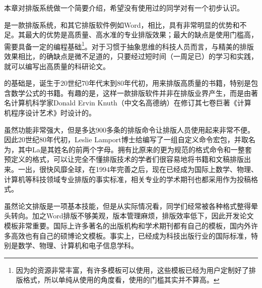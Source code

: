 

本章对排版系统做一个简要介绍，希望没有使用过的同学对有一个初步认识。


是一款排版系统，和其它排版软件例如Word，相比，具有非常明显的优势和不足。其最大的优势是高质量、高水准的专业排版效果；最大的缺点是使用门槛高，需要具备一定的编程基础\footnote{因为的资源非常丰富，有许多模板可以使用，这些模板已经为用户定制好了排版格式，所以单纯从使用的角度看，使用的门槛其实并不算高。}。对于习惯于抽象思维的科技人员而言，与精美的排版效果相比，的确缺点是微不足道的，只要经过短时间（一周足已）的学习和实践，就可以编写出高质量的科研论文。

的基础是，诞生于20世纪70年代末到80年代初，用来排版高质量的书籍，特别是包含数学公式的书籍。有趣的是，这样一款排版软件并非在排版业界产生，而是由著名计算机科学家Donald Ervin Knuth（中文名高德纳）在修订其七卷巨著《计算机程序设计艺术》时设计的。

虽然功能非常强大，但是多达900多条的排版命令让排版人员使用起来非常不便。因此20世纪80年代初，Leslie Lamport博士给编写了一组自定义命令宏包，并取名为，其中La是其姓名的前两个字母。拥有比原来的更为规范的格式命令和一整套预定义的格式，可以让完全不懂排版技术的学者们很容易地将书籍和文稿排版出来。一出，很快风靡全球，在1994年完善之后，现在已经成为国际上数学、物理、计算机等科技领域专业排版的事实标准，相关专业的学术期刊也都采用作为投稿格式。


虽然论文排版是一项基本技能，但是从实际情况看，同学们经常被各种格式整得晕头转向。加之Word排版不够美观，版本管理麻烦，排版效率低下，因此开发论文模板非常重要。国际上许多著名的出版机构和学术期刊都有自己的模板，国内外许多高效也有自己的硕博论文模板。事实上，已经成为科技出版行业的国际标准，特别是数学、物理、计算机和电子信息学科。

